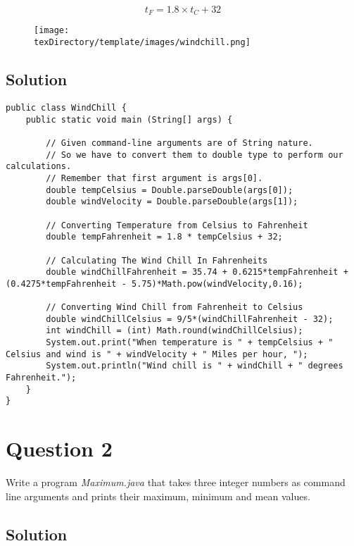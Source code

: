 \documentclass[12pt,letterpaper,twoside]{article}
\begin{document}
\begin{equation}
t_F = 1.8 \times t_C + 32
\label{eq2}
\end{equation}

\begin{figure}[H]\centering
	\texttt{[image: \\texDirectory/template/images/windchill.png]}
\end{figure}

\subsection*{Solution}

\lstset{language=Java}
\begin{lstlisting}
public class WindChill {
	public static void main (String[] args) {

		// Given command-line arguments are of String nature.
		// So we have to convert them to double type to perform our calculations.
		// Remember that first argument is args[0].
		double tempCelsius = Double.parseDouble(args[0]);
		double windVelocity = Double.parseDouble(args[1]);

		// Converting Temperature from Celsius to Fahrenheit
		double tempFahrenheit = 1.8 * tempCelsius + 32;

		// Calculating The Wind Chill In Fahrenheits
		double windChillFahrenheit = 35.74 + 0.6215*tempFahrenheit + (0.4275*tempFahrenheit - 5.75)*Math.pow(windVelocity,0.16);

		// Converting Wind Chill from Fahrenheit to Celsius
		double windChillCelsius = 9/5*(windChillFahrenheit - 32);
		int windChill = (int) Math.round(windChillCelsius);
		System.out.print("When temperature is " + tempCelsius + " Celsius and wind is " + windVelocity + " Miles per hour, ");
		System.out.println("Wind chill is " + windChill + " degrees Fahrenheit.");
	}
}
\end{lstlisting}

\section*{Question 2}

Write a program \textit{Maximum.java} that takes three integer numbers as command line arguments and prints their maximum, minimum and mean values.

\subsection*{Solution}
\end{document}
